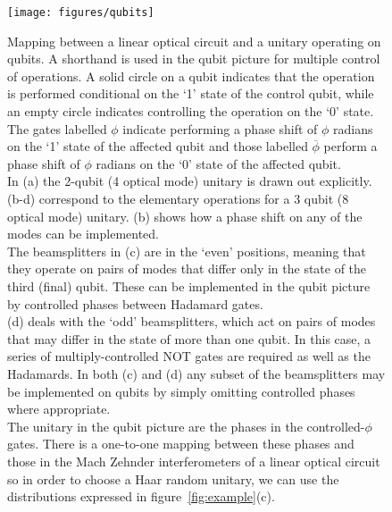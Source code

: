 \documentclass[aps,prl,twocolumn,floatfix]{revtex4}
\begin{document}
\begin{figure}[h]
  \texttt{[image: figures/qubits]}
  \caption{Mapping between a linear optical circuit and a unitary operating on
    qubits. A shorthand is used in the qubit picture for multiple control of
    operations. A solid circle on a qubit indicates that the operation is
    performed conditional on the `1' state of the control qubit, while an empty
    circle indicates controlling the operation on the `0' state. The gates
    labelled \(\phi\) indicate performing a phase shift of \(\phi\) radians on
    the `1' state of the affected qubit and those labelled \(\overline{\phi}\)
    perform a phase shift of \(\phi\) radians on the `0' state of the affected
    qubit. \\
    In (a) the 2-qubit (4 optical mode) unitary is drawn out explicitly.
    (b-d) correspond to the elementary operations for a 3 qubit (8 optical mode)
    unitary. (b) shows how a phase shift on any of the modes can be
    implemented. \\
    The beamsplitters in (c) are in the `even' positions, meaning that they
    operate on pairs of modes that differ only in the state of the third (final)
    qubit. These can be implemented in the qubit picture by controlled phases
    between Hadamard gates. \\
    (d) deals with the `odd' beamsplitters, which act on
    pairs of modes that may differ in the state of more than one qubit. In this
    case, a series of multiply-controlled NOT gates are required as well as the
    Hadamards. In both (c) and (d) any subset of the beamsplitters may be
    implemented on qubits by simply omitting controlled phases where
    appropriate. \\
    The unitary in the qubit picture are the phases in the controlled-\(\phi\)
    gates. There is a one-to-one mapping between these phases and those in the
    Mach Zehnder interferometers of a linear optical circuit so in order to
    choose a Haar random unitary, we can use the distributions expressed in
    figure~\ref{fig:example}(c).}
  \label{fig:qubits}
\end{figure}
  

\end{document}
